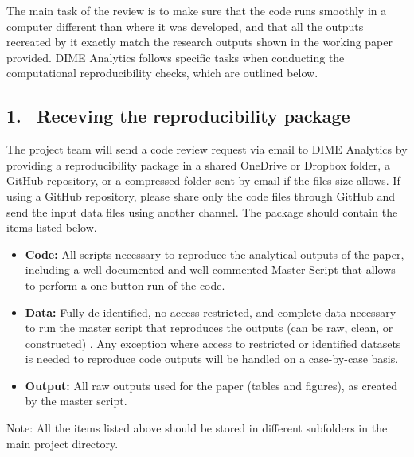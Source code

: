 \begin{fullwidth}
	The main task of the review is to make sure that the code runs smoothly in a computer different than where it was developed, and that all the outputs recreated by it exactly match the research outputs shown in the working paper provided.	
DIME Analytics follows specific tasks when conducting the computational reproducibility checks, which are outlined below.

	\subsection{1. \, Receving the reproducibility package}

	The project team will send a code review request via email to DIME Analytics by providing a reproducibility package in a shared OneDrive or Dropbox folder, a GitHub repository, or a compressed folder sent by email if the files size allows. If using a GitHub repository, please share only the code files through GitHub and send the input data files using another channel. The package should contain the items listed below.

	\bigskip

	\begin{itemize}
		\setlength\itemsep{-0.1em}
		\item \textbf{Code:} All scripts necessary to reproduce the analytical outputs of the paper, including a well-documented and well-commented Master Script that allows to perform a one-button run of the code.
		\item \textbf{Data:} Fully de-identified, no access-restricted, and complete data necessary to run the master script that reproduces the outputs (can be raw, clean, or constructed) . Any exception where access to restricted or identified datasets is needed to reproduce code outputs will be handled on a case-by-case basis.
		\item \textbf{Output:} All raw outputs used for the paper (tables and figures), as created by the master script.
	\end{itemize}

	\bigskip

	Note: All the items listed above should be stored in different subfolders in the main project directory.

	\bigskip


\end{fullwidth}

